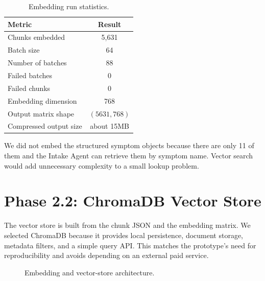\begin{table}[htbp]
\centering
\caption{Embedding run statistics.}
\label{tab:embedding_run_stats}
\begin{tabular}{p{} c}
\toprule
\textbf{Metric} & \textbf{Result}\\
\midrule
Chunks embedded & 5,631\\
Batch size & 64\\
Number of batches & 88\\
Failed batches & 0\\
Failed chunks & 0\\
Embedding dimension & 768\\
Output matrix shape & $(5631, 768)$\\
Compressed output size & about 15MB\\
\bottomrule
\end{tabular}
\end{table}

We did not embed the structured symptom objects because there are only 11 of them and the Intake Agent can retrieve them by symptom name. Vector search would add unnecessary complexity to a small lookup problem.

\section{Phase 2.2: ChromaDB Vector Store}

The vector store is built from the chunk JSON and the embedding matrix. We selected ChromaDB because it provides local persistence, document storage, metadata filters, and a simple query API. This matches the prototype's need for reproducibility and avoids depending on an external paid service.

\begin{figure}[htbp]
\centering
{}
\caption{Embedding and vector-store architecture.}
\label{fig:vector_store}
\end{figure}

